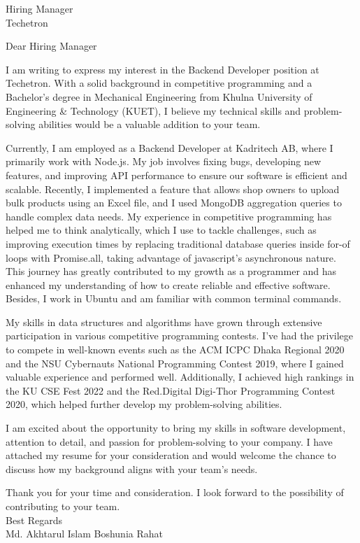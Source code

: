 \documentclass[a4paper,11pt]{letter}
\date{November 11, 2024} %
\begin{document}
\begin{letter}{Hiring Manager \\ Techetron}

\opening
{Dear Hiring Manager}

I am writing to express my interest in the Backend Developer position at Techetron. With a solid background in competitive programming and a Bachelor’s degree in Mechanical Engineering from Khulna University of Engineering \& Technology (KUET), I believe my technical skills and problem-solving abilities would be a valuable addition to your team.

Currently, I am employed as a Backend Developer at Kadritech AB, where I primarily work with Node.js. My job involves fixing bugs, developing new features, and improving API performance to ensure our software is efficient and scalable. Recently, I implemented a feature that allows shop owners to upload bulk products using an Excel file, and I used MongoDB aggregation queries to handle complex data needs. My experience in competitive programming has helped me to think analytically, which I use to tackle challenges, such as improving execution times by replacing traditional database queries inside for-of loops with Promise.all, taking advantage of javascript's asynchronous nature. This journey has greatly contributed to my growth as a programmer and has enhanced my understanding of how to create reliable and effective software. Besides, I work in Ubuntu and am familiar with common terminal commands.

My skills in data structures and algorithms have grown through extensive participation in various competitive programming contests. I’ve had the privilege to compete in well-known events such as the ACM ICPC Dhaka Regional 2020 and the NSU Cybernauts National Programming Contest 2019, where I gained valuable experience and performed well. Additionally, I achieved high rankings in the KU CSE Fest 2022 and the Red.Digital Digi-Thor Programming Contest 2020, which helped further develop my problem-solving abilities.


I am excited about the opportunity to bring my skills in software development, attention to detail, and passion for problem-solving to your company. I have attached my resume for your consideration and would welcome the chance to discuss how my background aligns with your team’s needs.

Thank you for your time and consideration. I look forward to the possibility of contributing to your team.\\

Best Regards\\
Md. Akhtarul Islam Boshunia Rahat

\end{letter}
\end{document}
